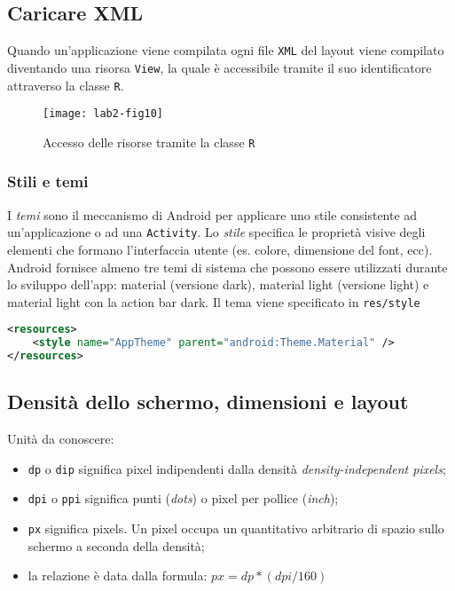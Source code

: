 \subsection{Caricare XML}

Quando un'applicazione viene compilata ogni file \texttt{XML} del layout viene
compilato diventando una risorsa \texttt{View}, la quale è accessibile tramite
il suo identificatore attraverso la classe \texttt{R}.

\begin{figure*}[htbp]
        \centering
        \texttt{[image: lab2-fig10]}
        \caption[Accesso risorse R]{Accesso delle risorse tramite la classe
\texttt{R}}
        \label{img:lab2-fig10}
\end{figure*}

\subsubsection{Stili e temi}

I \textit{temi} sono il meccanismo di Android per applicare uno stile
consistente ad un'applicazione o ad una \texttt{Activity}. Lo \textit{stile}
specifica le proprietà visive degli elementi che formano l'interfaccia utente
(es. colore, dimensione del font, ecc).
Android fornisce almeno tre temi di sistema che possono essere utilizzati
durante lo sviluppo dell'app: material (versione dark), material light (versione
light) e material light con la action bar dark. Il tema viene specificato in
\texttt{res/style}

\begin{lstlisting}[language=XML]
<resources>
    <style name="AppTheme" parent="android:Theme.Material" />
</resources>
\end{lstlisting}

\subsection{Densità dello schermo, dimensioni e layout}

Unità da conoscere:
\begin{itemize}
\item \texttt{dp} o \texttt{dip} significa pixel indipendenti dalla densità
\textit{density-independent pixels};
\item \texttt{dpi} o \texttt{ppi} significa punti (\textit{dots}) o pixel per
pollice (\textit{inch});
\item \texttt{px} significa pixels. Un pixel occupa un quantitativo arbitrario di spazio
sullo schermo a seconda della densità;
\item la relazione è data dalla formula: $px = dp * (dpi/160)$
\end{itemize}

